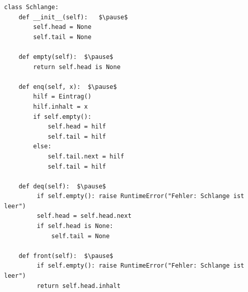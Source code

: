 \documentclass{beamer}
\begin{document}
\begin{frame}[fragile]
\begin{lstlisting}[mathescape=true]
class Schlange:
    def __init__(self):   $\pause$
        self.head = None
        self.tail = None

    def empty(self):  $\pause$
        return self.head is None

    def enq(self, x):  $\pause$
        hilf = Eintrag()
        hilf.inhalt = x
        if self.empty():
            self.head = hilf
            self.tail = hilf
        else:
            self.tail.next = hilf
            self.tail = hilf

    def deq(self):  $\pause$
         if self.empty(): raise RuntimeError("Fehler: Schlange ist leer")
         self.head = self.head.next
         if self.head is None:
             self.tail = None

    def front(self):  $\pause$
         if self.empty(): raise RuntimeError("Fehler: Schlange ist leer")
         return self.head.inhalt
\end{lstlisting} 
\end{frame}
\end{document}
